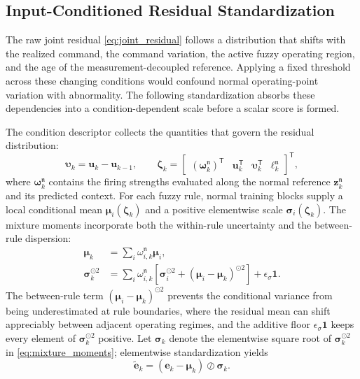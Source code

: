 \documentclass[journal]{IEEEtran}
\newcommand{\T}{\mathsf T}
\newcommand{\1}{\bm 1}
\begin{document}
\subsection{Input-Conditioned Residual Standardization}
The raw joint residual \eqref{eq:joint_residual} follows a distribution that
shifts with the realized command, the command variation, the active fuzzy
operating region, and the age of the measurement-decoupled reference. Applying
a fixed threshold across these changing conditions would confound normal
operating-point variation with abnormality. The following standardization
absorbs these dependencies into a condition-dependent scale before a scalar
score is formed.

The condition descriptor collects the quantities that govern the residual
distribution:
\begin{equation}
\bm\upsilon_k=\bm u_k-\bm u_{k-1},\qquad
\bm\zeta_k=
\begin{bmatrix}
(\bm\omega_k^{\mathfrak n})^\T&
\bm u_k^\T&
\bm\upsilon_k^\T&
\ell_k^{\mathfrak n}
\end{bmatrix}^{\T},
\label{eq:descriptor}
\end{equation}
where $\bm\omega_k^{\mathfrak n}$ contains the firing strengths evaluated
along the normal reference $\bm z_k^{\mathfrak n}$ and its predicted context.
For each fuzzy rule, normal training blocks supply a local conditional mean
$\bm\mu_i(\bm\zeta_k)$ and a positive elementwise scale
$\bm\sigma_i(\bm\zeta_k)$. The mixture moments incorporate both the
within-rule uncertainty and the between-rule dispersion:
\begin{equation}
\begin{aligned}
\bm\mu_k&=\sum_i\omega_{i,k}^{\mathfrak n}\bm\mu_i,\\
\bm\sigma_k^{\odot2}
&=\sum_i\omega_{i,k}^{\mathfrak n}
\left[
\bm\sigma_i^{\odot2}
+(\bm\mu_i-\bm\mu_k)^{\odot2}
\right]+\epsilon_\sigma\1 .
\end{aligned}
\label{eq:mixture_moments}
\end{equation}
The between-rule term $(\bm\mu_i-\bm\mu_k)^{\odot2}$ prevents the conditional
variance from being underestimated at rule boundaries, where the residual mean
can shift appreciably between adjacent operating regimes, and the additive
floor $\epsilon_\sigma\1$ keeps every element of $\bm\sigma_k^{\odot2}$
positive. Let $\bm\sigma_k$ denote the elementwise square root of
$\bm\sigma_k^{\odot2}$ in \eqref{eq:mixture_moments}; elementwise
standardization yields
\begin{equation}
\widetilde{\bm e}_k=
(\bm e_k-\bm\mu_k)\oslash\bm\sigma_k.
\label{eq:standardized_residual}
\end{equation}
\end{document}
